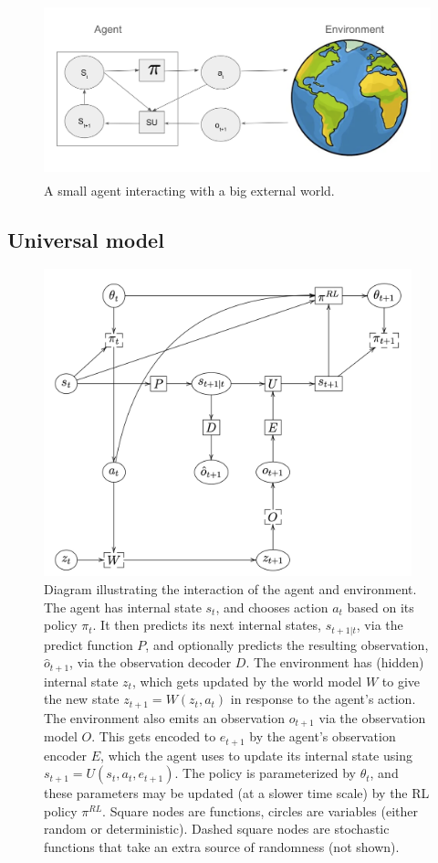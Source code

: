 \begin{figure}
\centering
\includegraphics[height=2in]{figs/agentEnvSlide.png}
\caption{
  A small agent interacting with a big external world.
  }
\label{fig:agentEnv}
\end{figure}

\subsection{Universal model}
\label{sec:universal}

\begin{figure}
\centering
\includegraphics[height=3.5in]{figs/agentPGM2cropped}
\caption{
  Diagram illustrating the interaction of the agent and environment.
  The agent has internal state $s_t$, and chooses action $a_t$
  based on its policy $\pi_t$.
  It then predicts its next internal states, $s_{t+1|t}$, via
  the predict function $P$,
  and optionally predicts the resulting observation,
  $\hat{o}_{t+1}$, via the observation decoder $D$.
  The environment has (hidden) internal state $z_t$, which gets updated
  by the world model $W$ to give the new state $z_{t+1}=W(z_t,a_t)$
  in response to the agent's action.
  The environment also emits an observation $o_{t+1}$ via
  the observation model $O$.
  This gets encoded to $e_{t+1}$ by the agent's observation encoder $E$,
  which the agent uses to update its internal state using
  $s_{t+1}=U(s_t,a_t,e_{t+1})$.
  The policy is parameterized by $\theta_t$,
  and these parameters may be updated (at a slower time scale) by the RL
  policy $\pi^{RL}$.
  Square nodes are functions, circles are variables (either random or deterministic).
  Dashed square nodes are stochastic functions that take an extra source of randomness
  (not shown).
  }
\label{fig:POMDP}
\end{figure}


